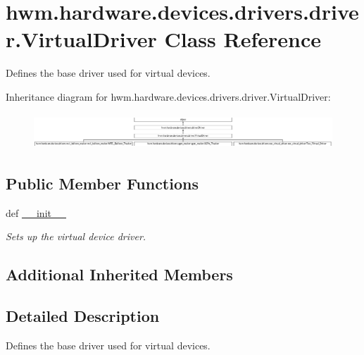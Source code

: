 \hypertarget{classhwm_1_1hardware_1_1devices_1_1drivers_1_1driver_1_1_virtual_driver}{\section{hwm.\-hardware.\-devices.\-drivers.\-driver.\-Virtual\-Driver Class Reference}
\label{classhwm_1_1hardware_1_1devices_1_1drivers_1_1driver_1_1_virtual_driver}
}


Defines the base driver used for virtual devices.  


Inheritance diagram for hwm.\-hardware.\-devices.\-drivers.\-driver.\-Virtual\-Driver\-:\begin{figure}[H]
\begin{center}
\leavevmode
\includegraphics[height=1.333333cm]{classhwm_1_1hardware_1_1devices_1_1drivers_1_1driver_1_1_virtual_driver}
\end{center}
\end{figure}
\subsection*{Public Member Functions}
\begin{DoxyCompactItemize}
\item 
def \hyperlink{classhwm_1_1hardware_1_1devices_1_1drivers_1_1driver_1_1_virtual_driver_a0524e13bd7a564b8042c538b44c42c65}{\-\_\-\-\_\-init\-\_\-\-\_\-}
\begin{DoxyCompactList}\small\item\em Sets up the virtual device driver. \end{DoxyCompactList}\end{DoxyCompactItemize}
\subsection*{Additional Inherited Members}


\subsection{Detailed Description}
Defines the base driver used for virtual devices. 

